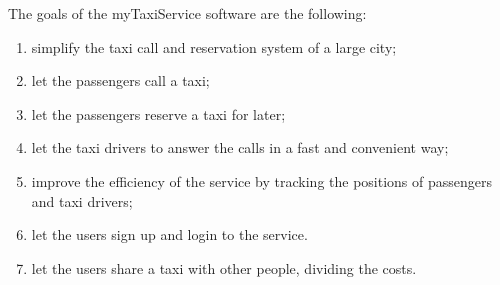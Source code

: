 The goals of the myTaxiService software are the following:
\begin{enumerate}
	\item simplify the taxi call and reservation system of a large city; \label{g-simplify}
	\item let the passengers call a taxi;  \label{g-taxicall}
	\item let the passengers reserve a taxi for later;  \label{g-reserve}
	\item let the taxi drivers to answer the calls in a fast and convenient way;  \label{g-notify}
	\item improve the efficiency of the service by tracking the positions of passengers and taxi drivers;  \label{g-position}
	\item let the users sign up and login to the service.  \label{g-login}
	\item let the users share a taxi with other people, dividing the costs. \label{g-share}
\end{enumerate}
